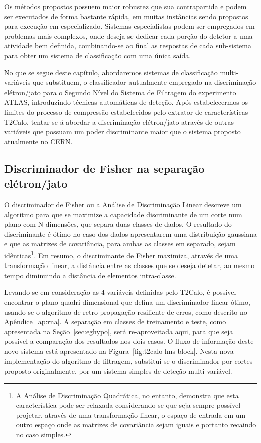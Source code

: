 Os métodos propostos possuem maior robustez que sua contrapartida e podem ser
executados de forma bastante rápida, em muitas instâncias sendo propostos para
execução em  especializado. Sistemas especialistas podem ser
empregados em problemas mais complexos, onde deseja-se dedicar cada porção do
detetor a uma atividade bem definida, combinando-se ao final as respostas de
cada sub-sistema para obter um sistema de classificação com uma única saída.

No que se segue deste capítulo, abordaremos sistemas de classificação
multi-variáveis que substituem, o classificador autualmente empregado na
discriminação elétron/jato para o Segundo Nível do Sistema de Filtragem do
experimento ATLAS, introduzindo técnicas automáticas de deteção. Após
estabelecermos os limites do processo de compressão estabelecidos pelo
extrator de características T2Calo, tentar-se-á abordar a discriminação
elétron/jato através de outras variáveis que possuam um poder discriminante
maior que o sistema proposto atualmente no CERN.

\subsection{Discriminador de Fisher na separação e\-lé\-tron/jato}
\label{sec:linear}

O discriminador de Fisher \cite{fisher} ou a Análise de Discriminação Linear
descreve um algoritmo para que se maximize a capacidade discriminante de um
corte num plano com N dimensões, que separa duas classes de dados. O resultado
do discriminante é ótimo no caso dos dados apresentarem uma distribuição
gaussiana e que as matrizes de covariância, para ambas as classes em separado,
sejam idênticas\footnote{A Análise de Discriminação Quadrática, no entanto,
demonstra que esta característica pode ser relaxada considerando-se que seja
sempre possível projetar, através de uma transformação linear, o espaço de
entrada em um outro espaço onde as matrizes de covariância sejam iguais e
portanto recaindo no caso simples.}. Em resumo, o discriminante de Fisher
maximiza, através de uma transformação linear, a distância entre as classes
que se deseja detetar, ao mesmo tempo diminuindo a distância de elementos
intra-classe.

Levando-se em consideração as 4 variáveis definidas pelo T2Calo, é possível
encontrar o plano quadri-dimensional que defina um discriminador linear ótimo,
usando-se o algoritmo de retro-propagação resiliente de erros, como descrito
no Apêndice~\ref{ap:rna}. A separação em classes de treinamento e teste, como
apresentada na Seção~\ref{sec:eghypo}, será re-aproveitada aqui, para que seja
possível a comparação dos resultados nos dois casos. O fluxo de informação
deste novo sistema está apresentado na
Figura~\ref{fig:t2calo-lms-block}. Nesta nova implementação do algoritmo de 
filtragem, substitui-se o discriminador por cortes proposto originalmente, por
um sistema simples de deteção multi-variável.

